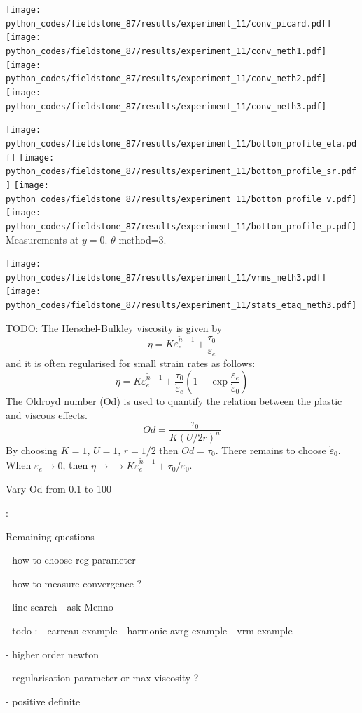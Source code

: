 \begin{center}
\texttt{[image: python\_codes/fieldstone\_87/results/experiment\_11/conv\_picard.pdf]}
\texttt{[image: python\_codes/fieldstone\_87/results/experiment\_11/conv\_meth1.pdf]}\\
\texttt{[image: python\_codes/fieldstone\_87/results/experiment\_11/conv\_meth2.pdf]}
\texttt{[image: python\_codes/fieldstone\_87/results/experiment\_11/conv\_meth3.pdf]}
\end{center}

\begin{center}
\texttt{[image: python\_codes/fieldstone\_87/results/experiment\_11/bottom\_profile\_eta.pdf]}
\texttt{[image: python\_codes/fieldstone\_87/results/experiment\_11/bottom\_profile\_sr.pdf]}
\texttt{[image: python\_codes/fieldstone\_87/results/experiment\_11/bottom\_profile\_v.pdf]}
\texttt{[image: python\_codes/fieldstone\_87/results/experiment\_11/bottom\_profile\_p.pdf]}\\
{\captionfont Measurements at $y=0$. $\theta$-method=3.}
\end{center}

\begin{center}
\texttt{[image: python\_codes/fieldstone\_87/results/experiment\_11/vrms\_meth3.pdf]}
\texttt{[image: python\_codes/fieldstone\_87/results/experiment\_11/stats\_etaq\_meth3.pdf]}
\end{center}

TODO: The Herschel-Bulkley viscosity is given by
\[
\eta 
= K \dot{\varepsilon}_e^{\tilde{n}-1} + \frac{\tau_0}{\dot\varepsilon_e}
\]
and it is often regularised for small strain rates as follows:
\[
\eta 
= K \dot{\varepsilon}_e^{\tilde{n}-1} + \frac{\tau_0}{\dot\varepsilon_e}
\left(
1 - \exp \frac{\dot\varepsilon_e}{\dot\varepsilon_0}
\right)
\]
The Oldroyd number (Od) is used to quantify
the relation between the plastic and viscous effects.
\cite{demj04}
\[
Od =  \frac{\tau_0}{K (U/2r)^n}
\]
By choosing $K=1$, $U=1$, $r=1/2$ then $Od=\tau_0$. 
There remains to choose $\dot\varepsilon_0$. When $\dot\varepsilon_e \rightarrow 0$,
then $\eta \rightarrow \rightarrow K \dot{\varepsilon}_e^{\tilde{n}-1} + \tau_0/\dot\varepsilon_0$.



Vary Od from 0.1 to 100 




\newpage

\Literature: \textcite{russ20} \textcite{spmw16}

Remaining questions

- how to choose reg parameter

- how to measure convergence ?

- line search - ask Menno

- todo : 
  - carreau example
  - harmonic avrg example
  - vrm example

- higher order newton

- regularisation parameter or max viscosity ?

- positive definite

